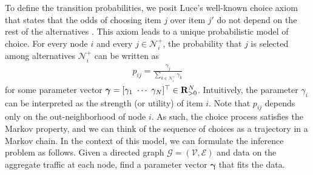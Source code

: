 To define the transition probabilities, we posit Luce's well-known choice axiom that states that the odds of choosing item $j$ over item $j'$ do not depend on the rest of the alternatives \citep{luce1959individual}.
This axiom leads to a unique probabilistic model of choice.
For every node $i$ and every $j \in \mathcal{N}^+_i$, the probability that $j$ is selected among alternatives $\mathcal{N}^+_i$ can be written as
\begin{align}
\label{cr:eq:singlelik}
p_{ij} = \frac{\gamma_j}{\sum_{k \in \mathcal{N}^+_i} \gamma_k}
\end{align}
for some parameter vector $\bm{\gamma} = [\gamma_1 \ \cdots \ \gamma_N]^\Tr \in \mathbf{R}_{>0}^N$.
Intuitively, the parameter $\gamma_i$ can be interpreted as the strength (or utility) of item $i$.
Note that $p_{ij}$ depends only on the out-neighborhood of node $i$.
As such, the choice process satisfies the Markov property, and we can think of the sequence of choices as a trajectory in a Markov chain.
In the context of this model, we can formulate the inference problem as follows.
Given a directed graph $\mathcal{G} = (\mathcal{V}, \mathcal{E})$ and data on the aggregate traffic at each node, find a parameter vector $\bm{\gamma}$ that fits the data.
